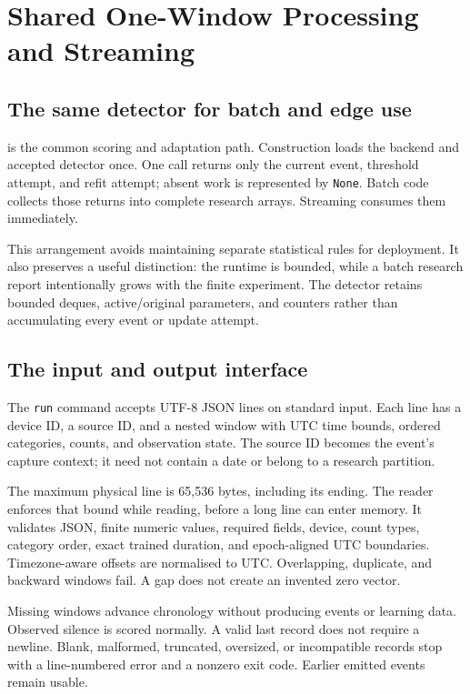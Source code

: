\section{Shared One-Window Processing and Streaming}

\subsection{The same detector for batch and edge use}

 is the common scoring and adaptation path.
Construction loads the backend and accepted detector once. One call returns
only the current event, threshold attempt, and refit attempt; absent work is
represented by \texttt{None}. Batch code collects those returns into complete
research arrays. Streaming consumes them immediately.

This arrangement avoids maintaining separate statistical rules for deployment.
It also preserves a useful distinction: the runtime is bounded, while a batch
research report intentionally grows with the finite experiment. The detector
retains bounded deques, active/original parameters, and counters rather than
accumulating every event or update attempt.

\subsection{The input and output interface}

The \texttt{run} command accepts UTF-8 JSON lines on standard input.
Each line has a device ID, a source ID, and a nested window with UTC time bounds,
ordered categories, counts, and observation state. The source ID becomes the
event's capture context; it need not contain a date or belong to a research
partition.

The maximum physical line is 65,536 bytes, including its ending. The reader
enforces that bound while reading, before a long line can enter memory.
It validates JSON, finite numeric values, required fields, device, count types,
category order, exact trained duration, and epoch-aligned UTC boundaries.
Timezone-aware offsets are normalised to UTC. Overlapping, duplicate, and
backward windows fail. A gap does not create an invented zero vector.

Missing windows advance chronology without producing events or learning data.
Observed silence is scored normally. A valid last record does not require a
newline. Blank, malformed, truncated, oversized, or incompatible records stop
with a line-numbered error and a nonzero exit code. Earlier emitted events
remain usable.

